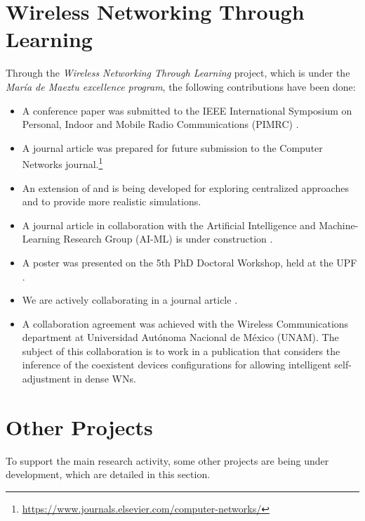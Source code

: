 \documentclass[12pt, a4paper,twoside]{tesi_upf}
\begin{document}
		\section{Wireless Networking Through Learning}
		\label{section:mdm}		
			Through the \textit{Wireless Networking Through Learning} project, which is under the \textit{Mar\'ia de Maeztu excellence program}, the following contributions have been done:
			\begin{itemize}
				\item A conference paper was submitted to the IEEE International Symposium on Personal, Indoor and Mobile Radio Communications (PIMRC) \cite{wilhelmi2017implications}.
				\item A journal article \cite{wilhelmi2017enhancing} was prepared for future submission to the Computer Networks journal.\footnote{\url{https://www.journals.elsevier.com/computer-networks/}}
				\item An extension of \cite{wilhelmi2017implications} and \cite{wilhelmi2017enhancing} is being developed for exploring centralized approaches and to provide more realistic simulations.
				\item A journal article in collaboration with the Artificial Intelligence and Machine-Learning Research Group (AI-ML) is under construction \cite{bellalta2017learning}.
				\item A poster was presented on the 5th PhD Doctoral Workshop, held at the UPF \cite{wilhelmi2017improving}.
				\item We are actively collaborating in a journal article \cite{barrachina2017ctmn}.
				\item A collaboration agreement was achieved with the Wireless Communications department at Universidad Aut\'onoma Nacional de M\'exico (UNAM). The subject of this collaboration is to work in a publication that considers the inference of the coexistent devices configurations for allowing intelligent self-adjustment in dense WNs.
			\end{itemize}	
			
		\section{Other Projects}
		\label{section:other_projects}	
			To support the main research activity, some other projects are being under development, which are detailed in this section.
\end{document}
